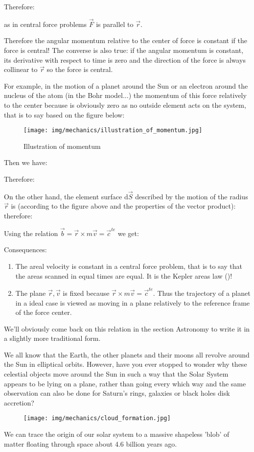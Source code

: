 	Therefore:
	
 	as in central force problems $\vec{F}$ is parallel to 
$\vec{r}$.

	Therefore the angular momentum relative to the center of force is constant if the force is central! The converse is also true: if the angular momentum is constant, its derivative with respect to time is zero and the direction of the force is always collinear to $\vec{r}$ so the force is central.

	For example, in the motion of a planet around the Sun or an electron around the nucleus of the atom (in the Bohr model...) the momentum of this force relatively to the center because is obviously zero as no outside element acts on the system, that is to say based on the figure below:
	\begin{figure}[H]
		\centering
		\texttt{[image: img/mechanics/illustration\_of\_momentum.jpg]}
		\caption{Illustration of momentum}
	\end{figure}
	Then we have:
	
	Therefore:
	
	On the other hand, the element surface $\mathrm{d}\vec{S}$ described by the motion of the radius $\vec{r}$ is (according to the figure above and the properties of the vector product):
	therefore:
	
	Using the relation $\vec{b}=\vec{r}\times m\vec{v}=\vec{c}^{te}$ we get:
	
	Consequences:
	\begin{enumerate}
		\item The areal velocity is constant in a central force problem, that is to say that the areas scanned in equal times are equal. It is the Kepler areas law ()!

		\item The plane $\vec{r},\vec{v}$ is fixed because $\vec{r}\times m\vec{v}=\vec{c}^{te}$. Thus the trajectory of a planet in a ideal case is viewed as moving in a plane relatively to the reference frame of the force center.
	\end{enumerate}
	We'll obviously come back on this relation in the section Astronomy to write it in a slightly more traditional form.
	
	We all know that the Earth, the other planets and their moons all revolve around the Sun in elliptical orbits. However, have you ever stopped to wonder why these celestial objects move around the Sun in such a way that the Solar System appears to be lying on a plane, rather than going every which way and the same observation can also be done for Saturn's rings, galaxies or black holes disk accretion?
	\begin{figure}[H]
		\centering
		\texttt{[image: img/mechanics/cloud\_formation.jpg]}
	\end{figure}
	We can trace the origin of our solar system to a massive shapeless 'blob' of matter floating through space about 4.6 billion years ago.

